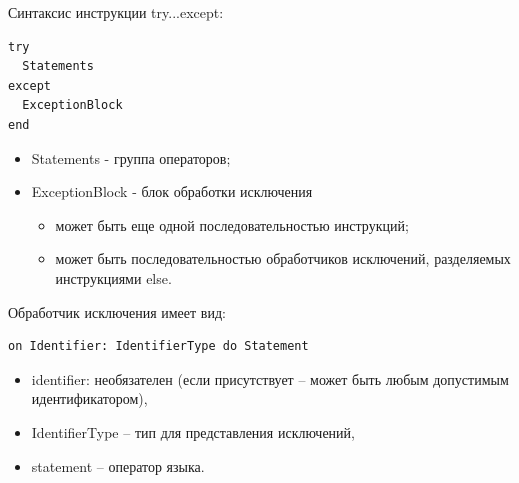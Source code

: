 \documentclass[xcolor=table]{beamer}
\begin{document}
\begin{frame}[fragile]
	Синтаксис инструкции try...except:
	\begin{verbatim}
try 
  Statements 
except 
  ExceptionBlock 
end
	\end{verbatim}
	\begin{itemize}
		\item Statements - группа операторов;
		\item ExceptionBlock - блок обработки исключения
		\begin{itemize}
			\item может быть еще одной последовательностью инструкций;
			\item может быть последовательностью обработчиков исключений, разделяемых инструкциями else.
		\end{itemize}
	\end{itemize}
	Обработчик исключения имеет вид:
	\begin{verbatim}
on Identifier: IdentifierType do Statement
	\end{verbatim}
	\begin{itemize}
		\item identifier: необязателен (если присутствует – может быть любым допустимым идентификатором), 
		\item IdentifierType – тип для представления исключений, 
		\item statement – оператор языка.
	\end{itemize}
\end{frame}
\end{document}
